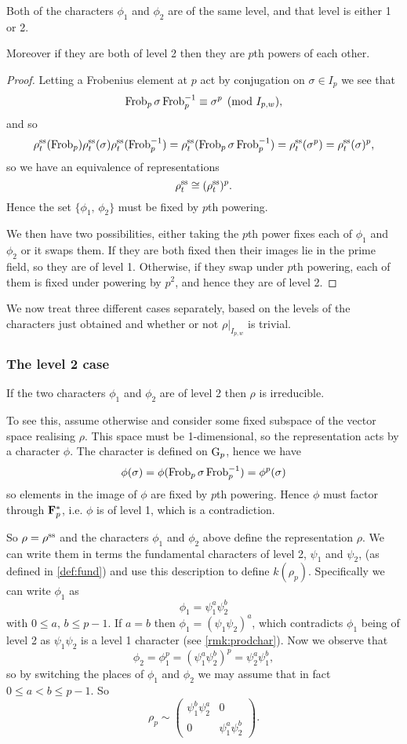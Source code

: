 \documentclass[a4paper,12pt]{article}
\begin{document}
\begin{prop}
Both of the characters $\phi_1$ and $\phi_2$ are of the same level, and that level is either 1 or 2.

Moreover if they are both of level 2 then they are $p$th powers of each other.
\end{prop}
\begin{proof}
Letting a Frobenius element at $p$ act by conjugation on $\sigma\in I_{p}$ we see that
\[
\operatorname{Frob}_p \sigma \operatorname{Frob}_p^{-1} \equiv \sigma^p \pmod{I_{p,w}},
\]
and so
\[
\rho^\text{ss}_t(\operatorname{Frob}_p) \rho^\text{ss}_t(\sigma) \rho^\text{ss}_t(\operatorname{Frob}_p^{-1}) =  \rho^\text{ss}_t( \operatorname{Frob}_p\sigma \operatorname{Frob}_p^{-1}) = \rho^\text{ss}_t(\sigma^p) = \rho^\text{ss}_t(\sigma)^p,
\]
so we have an equivalence of representations
\[
\rho^\text{ss}_t \cong (\rho^\text{ss}_t)^p.
\]
Hence the set $\{\phi_1,\,\phi_2\}$ must be fixed by $p$th powering.

We then have two possibilities, either taking the $p$th power fixes each of $\phi_1$ and $\phi_2$ or it swaps them.
If they are both fixed then their images lie in the prime field, so they are of level 1.
Otherwise, if they swap under $p$th powering, each of them is fixed under powering by $p^2$, and hence they are of level 2.
\end{proof}

We now treat three different cases separately, based on the levels of the characters just obtained and whether or not $\rho|_{I_{p,w}}$ is trivial.


\subsubsection{The level 2 case}\label{sec:l2}
If the two characters $\phi_1$ and $\phi_2$ are of level 2 then $\rho$ is irreducible.

To see this, assume otherwise and consider some fixed subspace of the vector space realising $\rho$.
This space must be 1-dimensional, so the representation acts by a character $\phi$. %
The character is defined on $\mathrm{G}_p$, hence we have
\[
\phi(\sigma) = \phi(\operatorname{Frob}_p\sigma\operatorname{Frob}_p^{-1}) = \phi^p(\sigma)
\]
so elements in the image of $\phi$ are fixed by $p$th powering.
Hence $\phi$ must factor through $\mathbf{F}_p^*$, i.e. $\phi$ is of level 1, which is a contradiction.

So $\rho = \rho^\text{ss}$ and the characters $\phi_1$ and $\phi_2$ above define the representation $\rho$.
We can write them in terms the fundamental characters of level 2, $\psi_1$ and $\psi_2$, (as defined in \cref{def:fund}) and use this description to define $k(\rho_p)$.
Specifically we can write $\phi_1$ as
\[
\phi_1 = \psi_1^a\psi_2^b
\]
with $0\le a,\,b\le p-1$.
If $a = b$ then $\phi_1 = (\psi_1 \psi_2)^a$, which contradicts $\phi_1$ being of level 2 as $\psi_1\psi_2$ is a level 1 character (see \cref{rmk:prodchar}).
Now we observe that
\[
\phi_2 = \phi_1^p = (\psi_1^a\psi_2^b)^p = \psi_2^a\psi_1^b,
\]
so by switching the places of $\phi_1$ and $\phi_2$ we may assume that in fact $0\le a < b\le p-1$.
So
\[
\rho_p \sim
\begin{pmatrix}
\psi_1^b\psi_2^a & 0 \\
0                & \psi_1^a\psi_2^b
\end{pmatrix}.
\]
\end{document}
